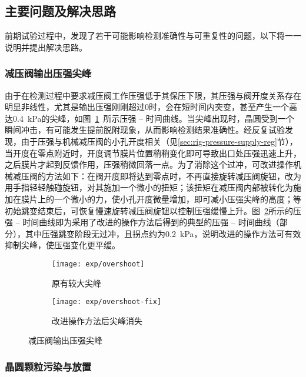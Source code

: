 \subsection{主要问题及解决思路}\label{sec:exp-pilot-fix}

前期试验过程中，发现了若干可能影响检测准确性与可重复性的问题，以下将一一说明并提出解决思路。

\subsubsection{减压阀输出压强尖峰}\label{sec:exp-pilot-fix-overshoot}

由于在检测过程中要求减压阀工作压强低于其保压下限，其压强与阀开度关系存在明显非线性，尤其是输出压强刚刚超过0时，会在短时间内突变，甚至产生一个高达\SI{0.4}{\kPa}的尖峰，如图~\ref{fig:exp-overshoot-before}~所示压强 -- 时间曲线。当尖峰出现时，晶圆受到一个瞬间冲击，有可能发生提前脱附现象，从而影响检测结果准确性。经反复试验发现，由于压强与机械减压阀的小孔开度相关（见\ref{sec:rig-pressure-supply-reg}节），当开度在零点附近时，开度调节膜片位置稍稍变化即可导致出口处压强迅速上升，之后膜片才起到反馈作用，压强稍微回落一点。为了消除这个过冲，可改进操作机械减压阀的方法如下：在阀开度即将达到零点时，不再直接旋转减压阀旋钮，改为用手指轻轻触碰旋钮，对其施加一个微小的扭矩；该扭矩在减压阀内部被转化为施加在膜片上的一个微小的力，使小孔开度微量增加，即可减小压强尖峰的高度；等初始跳变结束后，可恢复慢速旋转减压阀旋钮以控制压强缓慢上升。图~\ref{fig:exp-overshoot-after}所示的压强 -- 时间曲线即为采用了改进的操作方法后得到的典型的压强 -- 时间曲线（部分），其中压强跳变阶段无过冲，且拐点约为\SI{0.2}{\kPa}，说明改进的操作方法可有效抑制尖峰，使压强变化更平缓。

\begin{figure}[tbhp]
  \centering
  \begin{subfigure}{1\textwidth}
    \centering
    \texttt{[image: exp/overshoot]}
    \caption{原有较大尖峰}
    \label{fig:exp-overshoot-before}
  \end{subfigure}
  \par\bigskip
  \begin{subfigure}{1\textwidth}
    \centering
    \texttt{[image: exp/overshoot-fix]}
    \caption{改进操作方法后尖峰消失}
    \label{fig:exp-overshoot-after}
  \end{subfigure}
  \caption{减压阀输出压强尖峰}
  \label{fig:exp-overshoot}
\end{figure}

\subsubsection{晶圆颗粒污染与放置}\label{sec:exp-pilot-fix-wafer}

